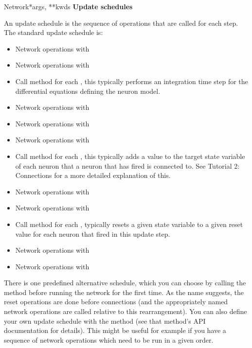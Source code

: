 \documentclass[letterpaper,10pt,english]{manual}
\begin{document}
\begin{classdesc}{Network}{*args, **kwds}
\textbf{Update schedules}

An update schedule is the sequence of operations that are
called for each  step. The standard update schedule is:
\begin{itemize}
\item {} 
Network operations with 

\item {} 
Network operations with 

\item {} 
Call  method for each \hyperlink{brian.NeuronGroup}{}, this typically
performs an integration time step for the differential equations
defining the neuron model.

\item {} 
Network operations with 

\item {} 
Network operations with 

\item {} 
Network operations with 

\item {} 
Call  method for each \hyperlink{brian.Connection}{}, this
typically adds a value to the target state variable of each neuron
that a neuron that has fired is connected to. See Tutorial 2: Connections for
a more detailed explanation of this.

\item {} 
Network operations with 

\item {} 
Network operations with 

\item {} 
Call  method for each \hyperlink{brian.NeuronGroup}{}, typically resets a
given state variable to a given reset value for each neuron that fired
in this update step.

\item {} 
Network operations with 

\item {} 
Network operations with 

\end{itemize}

There is one predefined alternative schedule, which you can choose by calling
the  method before running the
network for the first time. As the name suggests, the reset operations are
done before connections (and the appropriately named network operations are
called relative to this rearrangement). You can also define your own update
schedule with the  method (see that method's API documentation for
details). This might be useful for example if you have a sequence of network
operations which need to be run in a given order.
\end{classdesc}
\end{document}
